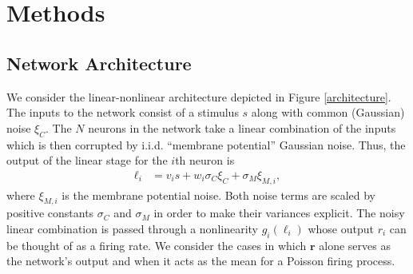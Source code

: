 \documentclass[11pt]{article}
\begin{document}
	\section{Methods}
	\subsection{Network Architecture}
	We consider the linear-nonlinear architecture depicted in Figure \ref{architecture}. The inputs to the network consist of a stimulus $s$ along with common (Gaussian) noise $\xi_C$. The $N$ neurons in the network take a linear combination of the inputs which is then corrupted by i.i.d. ``membrane potential'' Gaussian noise. Thus, the output of the linear stage for the $i$th neuron is 
	\begin{align}
		\ell_i &= v_i s + w_i \sigma_C \xi_C + \sigma_M\xi_{M,i},
	\end{align}
	where $\xi_{M,i}$ is the membrane potential noise. Both noise terms are scaled by positive constants $\sigma_C$ and $\sigma_M$ in order to make their variances explicit. The noisy linear combination is passed through a nonlinearity $g_i(\ell_i)$ whose output $r_i$ can be thought of as a firing rate. We consider the cases in which $\mathbf{r}$ alone serves as the network's output and when it acts as the mean for a Poisson firing process.
	
\end{document}
